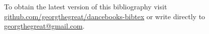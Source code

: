\documentclass[10pt,a4paper]{article}
\begin{document}
To obtain the latest version of this bibliography visit \href{http://github.com/georgthegreat/dancebooks-bibtex}{github.com/georgthegreat/dancebooks-bibtex} or write directly to \href{mailto://georgthegreat@gmail.com}{georgthegreat@gmail.com}.

\nocite{*}
\printbibliography
\end{document}
